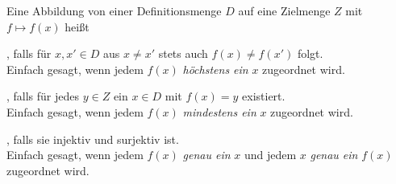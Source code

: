 Eine Abbildung von einer Definitionsmenge $D$ auf eine Zielmenge $Z$ mit $f \mapsto f(x)$ heißt
\begin{description}
    \item {}, falls für $x, x' \in D$ aus $x \neq x'$ stets auch $f(x) \neq f(x')$ folgt. \\
    Einfach gesagt, wenn jedem $f(x)$ \textit{höchstens ein} $x$ zugeordnet wird.
    \item {}, falls für jedes $y \in Z$ ein $x \in D$ mit $f(x) = y$ existiert. \\
    Einfach gesagt, wenn jedem $f(x)$ \textit{mindestens ein} $x$ zugeordnet wird.
    \item {}, falls sie injektiv und surjektiv ist. \\
    Einfach gesagt, wenn jedem $f(x)$ \textit{genau ein} $x$ und jedem $x$ \textit{genau ein} $f(x)$ zugeordnet wird.
\end{description}